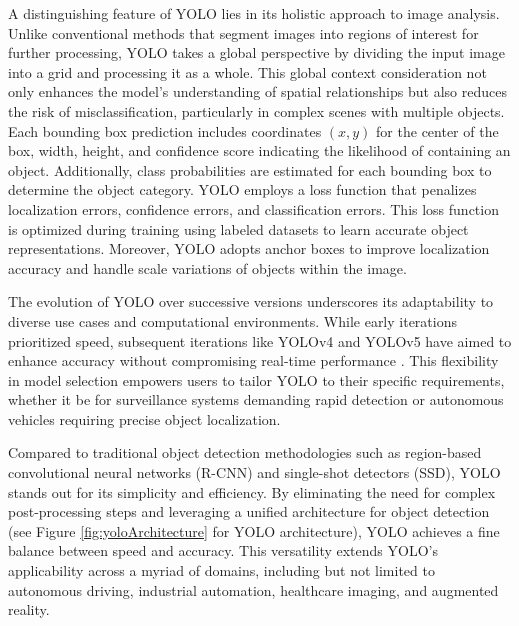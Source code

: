 A distinguishing feature of YOLO lies in its holistic approach to image analysis. Unlike conventional methods that segment images into regions of interest for further processing, YOLO takes a global perspective by dividing the input image into a grid and processing it as a whole. This global context consideration not only enhances the model's understanding of spatial relationships but also reduces the risk of misclassification, particularly in complex scenes with multiple objects. Each bounding box prediction includes coordinates $(x, y)$ for the center of the box, width, height, and confidence score indicating the likelihood of containing an object. Additionally, class probabilities are estimated for each bounding box to determine the object category. YOLO employs a loss function that penalizes localization errors, confidence errors, and classification errors.
This loss function is optimized during training using labeled datasets to learn accurate object representations. Moreover, YOLO adopts anchor boxes to improve localization accuracy and handle scale variations of objects within the image.

The evolution of YOLO over successive versions underscores its adaptability to diverse use cases and computational environments. While early iterations prioritized speed, subsequent iterations like YOLOv4 and YOLOv5 have aimed to enhance accuracy without compromising real-time performance \cite{YoloVersions2022}. This flexibility in model selection empowers users to tailor YOLO to their specific requirements, whether it be for surveillance systems demanding rapid detection or autonomous vehicles requiring precise object localization.

Compared to traditional object detection methodologies such as region-based convolutional neural networks (R-CNN) \cite{MaskRCNN2017} and single-shot detectors (SSD), YOLO stands out for its simplicity and efficiency. By eliminating the need for complex post-processing steps and leveraging a unified architecture for object detection (see Figure \ref{fig:yoloArchitecture} for YOLO architecture), YOLO achieves a fine balance between speed and accuracy. This versatility extends YOLO's applicability across a myriad of domains, including but not limited to autonomous driving, industrial automation, healthcare imaging, and augmented reality.

